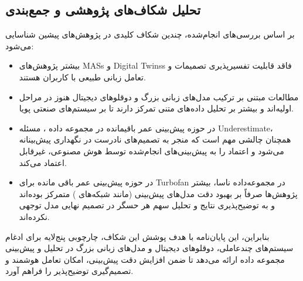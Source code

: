 \subsection{تحلیل شکاف‌های پژوهشی و جمع‌بندی}
بر اساس بررسی‌های انجام‌شده، چندین شکاف کلیدی در پژوهش‌های پیشین شناسایی می‌شود:
\begin{itemize}
	\item
	 بیشتر پژوهش‌های 
	\glspl{MAS} و
	\glspl{Digital Twins}
	 فاقد قابلیت تفسیرپذیری تصمیمات و تعامل زبانی طبیعی با کاربران هستند.
	 
	\item
	 مطالعات مبتنی بر 
	ترکیب مدل‌های زبانی بزرگ و دوقلوهای دیجیتال
	 هنوز در مراحل اولیه‌اند و بیشتر بر تحلیل داده‌های متنی تمرکز دارند تا بر سیستم‌های صنعتی پویا.
	 
	\item
	 در حوزه پیش‌بینی عمر باقیمانده در مجموعه داده ، مسئله 
	 \gls{Underestimate}،
	  همچنان چالشی مهم است که منجر به تصمیم‌های نادرست در نگهداری پیش‌بینانه می‌شود و اعتماد را به پیش‌بینی‌های انجام‌شده توسط هوش مصنوعی، غیرقابل اعتماد می‌کند.
	
	\item
	در حوزه پیش‌بینی عمر باقی‌ مانده برای \gls{Turbofan} در مجموعه‌داده 
		ناسا، بیشتر پژوهش‌ها صرفاً بر بهبود دقت مدل‌های پیش‌بینی (مانند شبکه‌های ) متمرکز بوده‌اند و به توضیح‌پذیری نتایج و تحلیل سهم هر حسگر در تصمیم نهایی مدل توجهی نکرده‌اند.
	
	
\end{itemize}

بنابراین، این پایان‌نامه با هدف پوشش این شکاف، چارچوبی پنج‌لایه برای ادغام سیستم‌های چندعاملی، دوقلوهای دیجیتال و مدل‌های زبانی بزرگ در تحلیل و پیش‌بینی مجموعه داده  ارائه می‌دهد تا ضمن افزایش دقت پیش‌بینی، امکان تعامل هوشمند و تصمیم‌گیری توضیح‌پذیر را فراهم آورد.




